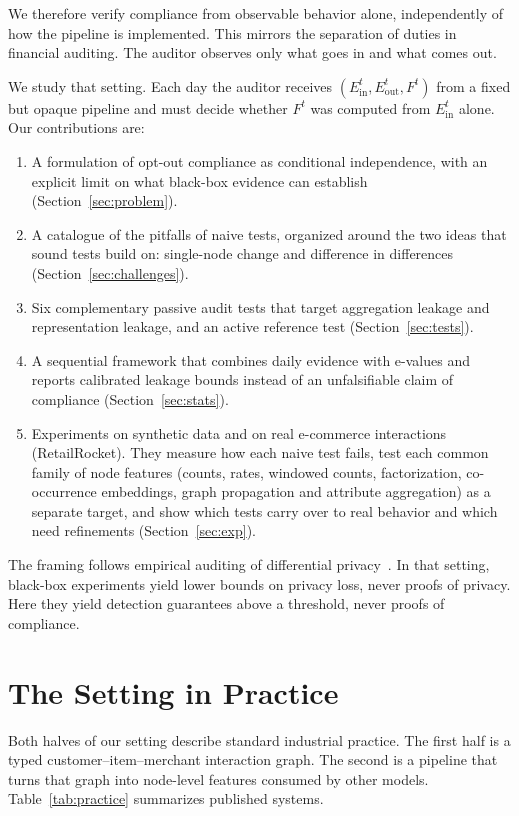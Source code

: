 \documentclass[10pt,twocolumn,letterpaper]{article}
\theoremstyle{definition}
\newcommand{\Ein}{E_{\mathrm{in}}}
\newcommand{\Eout}{E_{\mathrm{out}}}
\begin{document}
We therefore verify compliance from observable behavior alone, independently
of how the pipeline is implemented. This mirrors the separation of duties in
financial auditing. The auditor observes only what goes in and what comes out.

We study that setting. Each day the auditor receives
$(\Ein^t, \Eout^t, F^t)$ from a fixed but opaque pipeline and must decide
whether $F^t$ was computed from $\Ein^t$ alone. Our contributions are:
\begin{enumerate}
  \item A formulation of opt-out compliance as conditional independence, with
        an explicit limit on what black-box evidence can establish
        (Section~\ref{sec:problem}).
  \item A catalogue of the pitfalls of naive tests, organized around the two
        ideas that sound tests build on: single-node change and difference in
        differences (Section~\ref{sec:challenges}).
  \item Six complementary passive audit tests that target aggregation leakage
        and representation leakage, and an active reference test
        (Section~\ref{sec:tests}).
  \item A sequential framework that combines daily evidence with e-values and
        reports calibrated leakage bounds instead of an unfalsifiable claim of
        compliance (Section~\ref{sec:stats}).
  \item Experiments on synthetic data and on real e-commerce interactions
        (RetailRocket). They measure how each naive test fails, test each
        common family of node features (counts, rates, windowed counts,
        factorization, co-occurrence embeddings, graph propagation and
        attribute aggregation) as a separate target, and show which tests carry
        over to real behavior and which need refinements
        (Section~\ref{sec:exp}).
\end{enumerate}
The framing follows empirical auditing of differential
privacy~\citep{jagielski2020auditing,nasr2021adversary,steinke2023one}. In
that setting, black-box experiments yield lower bounds on privacy loss, never
proofs of privacy. Here they yield detection guarantees above a threshold,
never proofs of compliance.

\section{The Setting in Practice}\label{sec:practice}
Both halves of our setting describe standard industrial practice. The first
half is a typed customer--item--merchant interaction graph. The second is a
pipeline that turns that graph into node-level features consumed by other
models. Table~\ref{tab:practice} summarizes published systems.
\end{document}
